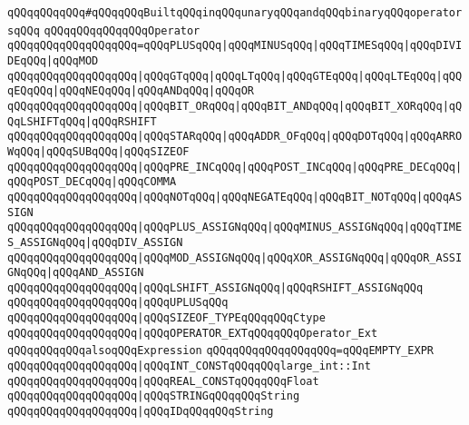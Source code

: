 \newline
\verb|qQQqqQQqqQQq#qQQqqQQqBuiltqQQqinqQQqunaryqQQqandqQQqbinaryqQQqoperatorsqQQq|\newline
\verb|qQQqqQQqqQQqqQQqOperator|\newline
\verb|qQQqqQQqqQQqqQQqqQQq=qQQqPLUSqQQq|\verb#|qQQqMINUSqQQq|qQQqTIMESqQQq|qQQqDIVIDEqQQq|qQQqMOD#\newline
\verb|qQQqqQQqqQQqqQQqqQQq|\verb#|qQQqGTqQQq|qQQqLTqQQq|qQQqGTEqQQq|qQQqLTEqQQq|qQQqEQqQQq|qQQqNEQqQQq|qQQqANDqQQq|qQQqOR#\newline
\verb|qQQqqQQqqQQqqQQqqQQq|\verb#|qQQqBIT_ORqQQq|qQQqBIT_ANDqQQq|qQQqBIT_XORqQQq|qQQqLSHIFTqQQq|qQQqRSHIFT#\newline
\verb|qQQqqQQqqQQqqQQqqQQq|\verb#|qQQqSTARqQQq|qQQqADDR_OFqQQq|qQQqDOTqQQq|qQQqARROWqQQq|qQQqSUBqQQq|qQQqSIZEOF#\newline
\verb|qQQqqQQqqQQqqQQqqQQq|\verb#|qQQqPRE_INCqQQq|qQQqPOST_INCqQQq|qQQqPRE_DECqQQq|qQQqPOST_DECqQQq|qQQqCOMMA#\newline
\verb|qQQqqQQqqQQqqQQqqQQq|\verb#|qQQqNOTqQQq|qQQqNEGATEqQQq|qQQqBIT_NOTqQQq|qQQqASSIGN#\newline
\verb|qQQqqQQqqQQqqQQqqQQq|\verb#|qQQqPLUS_ASSIGNqQQq|qQQqMINUS_ASSIGNqQQq|qQQqTIMES_ASSIGNqQQq|qQQqDIV_ASSIGN#\newline
\verb|qQQqqQQqqQQqqQQqqQQq|\verb#|qQQqMOD_ASSIGNqQQq|qQQqXOR_ASSIGNqQQq|qQQqOR_ASSIGNqQQq|qQQqAND_ASSIGN#\newline
\verb|qQQqqQQqqQQqqQQqqQQq|\verb#|qQQqLSHIFT_ASSIGNqQQq|qQQqRSHIFT_ASSIGNqQQq#\newline
\verb|qQQqqQQqqQQqqQQqqQQq|\verb#|qQQqUPLUSqQQq#\newline
\verb|qQQqqQQqqQQqqQQqqQQq|\verb#|qQQqSIZEOF_TYPEqQQqqQQqCtype#\newline
\verb|qQQqqQQqqQQqqQQqqQQq|\verb#|qQQqOPERATOR_EXTqQQqqQQqOperator_Ext#\newline
\newline
\verb|qQQqqQQqqQQqalsoqQQqExpression|\newline
\verb|qQQqqQQqqQQqqQQqqQQq=qQQqEMPTY_EXPR|\newline
\verb|qQQqqQQqqQQqqQQqqQQq|\verb#|qQQqINT_CONSTqQQqqQQqlarge_int::Int#\newline
\verb|qQQqqQQqqQQqqQQqqQQq|\verb#|qQQqREAL_CONSTqQQqqQQqFloat#\newline
\verb|qQQqqQQqqQQqqQQqqQQq|\verb#|qQQqSTRINGqQQqqQQqString#\newline
\verb|qQQqqQQqqQQqqQQqqQQq|\verb#|qQQqIDqQQqqQQqString#\newline
